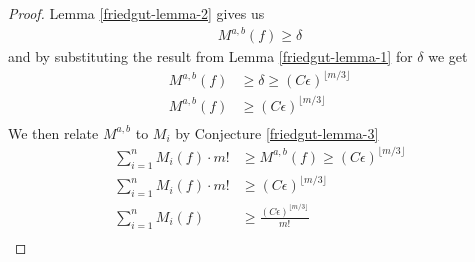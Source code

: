 	\begin{proof}
		Lemma \ref{friedgut-lemma-2} gives us
		\begin{align*}
			M^{a,b}(f) \ge \delta
		\end{align*}
		and by substituting the result from Lemma \ref{friedgut-lemma-1} for $\delta$ we get
		\begin{align*}
			M^{a,b}(f) &\ge \delta \ge (C\epsilon)^{\lfloor m/3 \rfloor} \\
			M^{a,b}(f) &\ge (C\epsilon)^{\lfloor m/3 \rfloor} \\
		\end{align*}
		We then relate $M^{a,b}$ to $M_i$ by Conjecture \ref{friedgut-lemma-3}
		\begin{align*}
			\sum^n_{i=1} M_i(f) \cdot m! &\ge M^{a,b}(f) \ge (C\epsilon)^{\lfloor m/3 \rfloor} \\
			\sum^n_{i=1} M_i(f) \cdot m! &\ge (C\epsilon)^{\lfloor m/3 \rfloor} \\
			\sum^n_{i=1} M_i(f) &\ge \frac{(C\epsilon)^{\lfloor m/3 \rfloor}}{m!} \\
		\end{align*}
	\end{proof}
